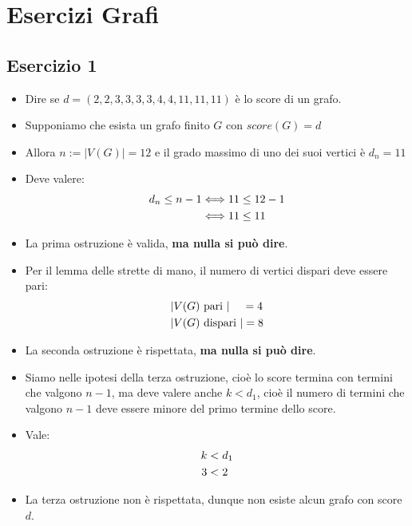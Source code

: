 \documentclass[10pt]{article}
\begin{document}
	\newpage
	\section{Esercizi Grafi}
	\subsection{Esercizio 1}
	\begin{itemize}
	\item
	Dire se $d = (2,2,3,3,3,3,4,4,11,11,11)$ è lo score di un grafo.
	\item
	Supponiamo che esista un grafo finito $G$ con $score(G) = d$
	\item
	Allora $n := |V(G)| = 12$ e il grado massimo di uno dei suoi vertici è $d_n = 11$
	\item
	Deve valere:
	\begin{equation}
	\begin{split}
		d_n \leq n - 1 &\Longleftrightarrow 11 \leq 12 - 1  \\
		&\Longleftrightarrow 11 \leq 11
		\notag
		\end{split}
	\end{equation}
	\item
	La prima ostruzione è valida, \textbf{ma nulla si può dire}.
	\item
	Per il lemma delle strette di mano, il numero di vertici dispari deve essere pari:
	\begin{equation}
	\begin{split}
		|&V(G) \textrm{ pari }| \quad\, =  4\\
		|&V(G) \textrm{ dispari }| = 8 
		\notag
		\end{split}
	\end{equation}
	\item
	La seconda ostruzione è rispettata, \textbf{ma nulla si può dire}.
	\item
	Siamo nelle ipotesi della terza ostruzione, cioè lo score termina con termini che valgono $n-1$, ma deve valere anche $k < d_1$, cioè il numero di termini che valgono $n-1$ deve essere minore del primo termine dello score.
	\item
	Vale:
	\begin{equation}
	\begin{split}
		k &< d_1 \\
		3 &< 2
		\notag
		\end{split}
	\end{equation}
	\item
	La terza ostruzione non è rispettata, dunque non esiste alcun grafo con score $d$.
	\end{itemize}
	
\end{document}
